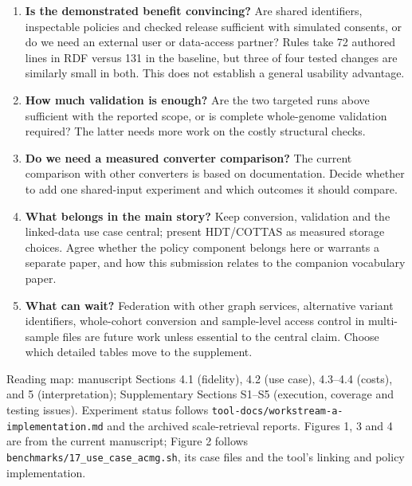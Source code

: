 \documentclass[11pt]{article}
\newcommand{\hd}[1]{\needspace{5\baselineskip}\vspace{7pt}{\large\bfseries\color{accent}#1}\par\vspace{2pt}}
\begin{document}
\hd{6. Decisions for the coauthors}
\begin{enumerate}[itemsep=9pt]
\item \textbf{Is the demonstrated benefit convincing?} Are shared identifiers,
inspectable policies and checked release sufficient with simulated consents, or
do we need an external user or data-access partner? Rules take 72 authored lines
in RDF versus 131 in the baseline, but three of four tested changes are similarly
small in both. This does not establish a general usability advantage.
\item \textbf{How much validation is enough?} Are the two targeted runs above
sufficient with the reported scope, or is complete whole-genome validation
required? The latter needs more work on the costly structural checks.
\item \textbf{Do we need a measured converter comparison?} The current comparison
with other converters is based on documentation. Decide whether to add one
shared-input experiment and which outcomes it should compare.
\item \textbf{What belongs in the main story?} Keep conversion, validation and the
linked-data use case central; present HDT/COTTAS as measured storage choices.
Agree whether the policy component belongs here or warrants a separate paper,
and how this submission relates to the companion vocabulary paper.
\item \textbf{What can wait?} Federation with other graph services, alternative
variant identifiers, whole-cohort conversion and sample-level access control
in multi-sample files are future work unless essential to the central claim.
Choose which detailed tables move to the supplement.
\end{enumerate}

\vfill
{\footnotesize\color{gray}\raggedright
Reading map: manuscript Sections 4.1 (fidelity), 4.2 (use case), 4.3--4.4
(costs), and 5 (interpretation); Supplementary Sections S1--S5 (execution,
coverage and testing issues). Experiment status follows
\nolinkurl{tool-docs/workstream-a-implementation.md} and the archived scale-retrieval
reports. Figures 1, 3 and 4 are from the current manuscript; Figure 2 follows
\nolinkurl{benchmarks/17_use_case_acmg.sh}, its case files and the tool's
linking and policy implementation.\par}
\end{document}
